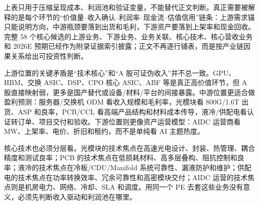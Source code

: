 上表只用于压缩呈现成本、利润池和验证变量，不能替代正文判断。真正需要被解释的是每个环节的“价值量--收入确认--利润率--现金流--估值信用”链条：上游需求锚只能说明方向，中游瓶颈要落到出货和毛利，下游资产要落到上架率和现金回收。完整 58 个核心候选的上游业务、下游业务、业务关联、核心技术、核心营收业务和 2026E 预期已经作为附录证据索引披露；正文不再逐行铺表，而是按产业链因果关系给出可投资性判断。

上游位置的关键矛盾是“技术核心”和“A 股可证伪收入”并不总一致。GPU、HBM、交换 ASIC、DSP、CPO 核心 ASIC、ABF 等是真正高价值环节，但 A 股直接映射弱，更多是国产替代或设备/材料/平台的间接暴露。中游位置更适合做盈利预测：服务器/交换机 ODM 看收入规模和毛利率，光模块看 800G/1.6T 出货、ASP 和良率，PCB/CCL 看高端产品结构和材料成本传导，液冷/供配电看认证转订单、项目交付和验收。下游位置则更像资产运营模型：AIDC 运营商看 MW、上架率、电价、折旧和租约，而不是单纯看 AI 主题热度。

核心技术也必须分层看。光模块的技术焦点在高速光电设计、封装、热管理、耦合精度和测试良率；PCB 的技术焦点在低损耗材料、高多层叠构、阻抗控制和良率；液冷的技术焦点在冷板/CDU/Manifold 系统可靠性、漏液防护和维护；供配电的技术焦点在功率转换效率、冗余可靠性和高密模块交付；AIDC 运营的技术焦点则是机房电力、网络、冷却、SLA 和调度。用同一个 PE 去套这些业务没有意义，必须先判断收入驱动和利润池在哪里。

